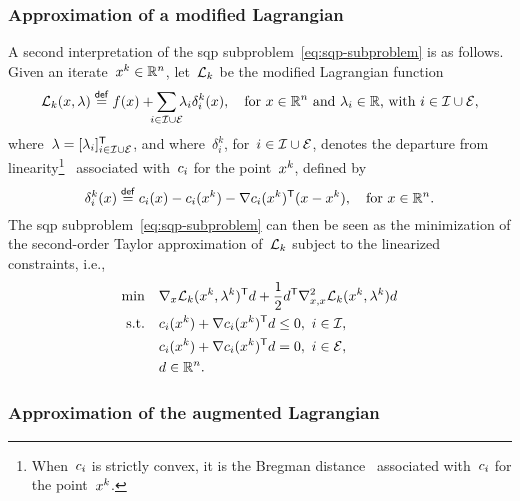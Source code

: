 \subsubsection{Approximation of a modified Lagrangian}

A second interpretation of the \gls{sqp} subproblem~\cref{eq:sqp-subproblem} is as follows.
Given an iterate~$\iter[k] \in \R^n$, let~$\lag[k]$ be the modified Lagrangian function
\begin{equation*}
    \lag[k](\iter, \lambda) \eqdef \obj(\iter) + \sum_{\mathclap{i \in \iub \cup \ieq}} \lambda_i \delta_i^k(\iter), \quad \text{for~$\iter \in \R^n$ and~$\lambda_i \in \R$, with~$i \in \iub \cup \ieq$},
\end{equation*}
where~$\lambda = [\lambda_i]_{i \in \mathcal{I} \cup \mathcal{E}}^{\mathsf{T}}$, and where~$\delta_i^k$, for~$i \in \mathcal{I} \cup \mathcal{E}$, denotes the departure from linearity\footnote{When~$c_{i}$ is strictly convex, it is the Bregman distance~\cite{Bregman_1967} associated with~$c_{i}$ for the point~$\iter[k]$.}~\cite{Robinson_1972,Hoek_1982} associated with~$c_{i}$ for the point~$\iter[k]$, defined by
\begin{equation*}
    \delta_i^k(\iter) \eqdef \con{i}(\iter) - \con{i}(\iter[k]) - \nabla \con{i}(\iter[k])^{\T} (\iter - \iter[k]), \quad \text{for~$\iter \in \R^n$.}
\end{equation*}
The \gls{sqp} subproblem~\cref{eq:sqp-subproblem} can then be seen as the minimization of the second-order Taylor approximation of~$\lag[k]$ subject to the linearized constraints, i.e.,
\begin{align}
    \min        & \quad \nabla_x \lag[k](\iter[k], \lambda^k)^{\T} \step + \frac{1}{2} \step^{\T} \nabla_{x, x}^2 \lag[k](\iter[k], \lambda^k) \step\\
    \text{s.t.} & \quad \con{i}(\iter[k]) + \nabla \con{i}(\iter[k])^{\T} \step \le 0, ~ i \in \iub,\\
                & \quad \con{i}(\iter[k]) + \nabla \con{i}(\iter[k])^{\T} \step = 0, ~ i \in \ieq,\\
                & \quad \step \in \R^n.
\end{align}

\subsubsection{Approximation of the augmented Lagrangian}

